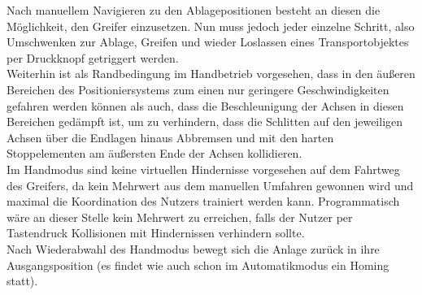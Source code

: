 \documentclass[../Bachelorarbeit.tex]{subfiles}
\begin{document}
Nach manuellem Navigieren zu den Ablagepositionen besteht an diesen die Möglichkeit, den Greifer einzusetzen. Nun muss jedoch jeder einzelne Schritt, also Umschwenken zur Ablage, Greifen und wieder Loslassen eines Transportobjektes per Druckknopf getriggert werden.\\
Weiterhin ist als Randbedingung im Handbetrieb vorgesehen, dass in den äußeren Bereichen des Positioniersystems zum einen nur geringere Geschwindigkeiten gefahren werden können als auch, dass die Beschleunigung der Achsen in diesen Bereichen gedämpft ist, um zu verhindern, dass die Schlitten auf den jeweiligen Achsen über die Endlagen hinaus Abbremsen und mit den harten Stoppelementen am äußersten Ende der Achsen kollidieren.\\
Im Handmodus sind keine virtuellen Hindernisse vorgesehen auf dem Fahrtweg des Greifers, da kein Mehrwert aus dem manuellen Umfahren gewonnen wird und maximal die Koordination des Nutzers trainiert werden kann. Programmatisch wäre an dieser Stelle kein Mehrwert zu erreichen, falls der Nutzer per Tastendruck Kollisionen mit Hindernissen verhindern sollte.\\
Nach Wiederabwahl des Handmodus bewegt sich die Anlage zurück in ihre Ausgangsposition (es findet wie auch schon im Automatikmodus ein Homing statt).
\end{document}
